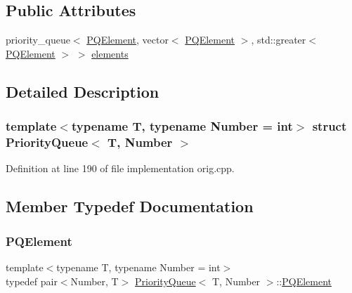 \subsection*{Public Attributes}
\begin{DoxyCompactItemize}
\item 
priority\+\_\+queue$<$ \hyperlink{struct_priority_queue_ae86a19aae3f9a32a1d76dfdab34eb70b}{P\+Q\+Element}, vector$<$ \hyperlink{struct_priority_queue_ae86a19aae3f9a32a1d76dfdab34eb70b}{P\+Q\+Element} $>$, std\+::greater$<$ \hyperlink{struct_priority_queue_ae86a19aae3f9a32a1d76dfdab34eb70b}{P\+Q\+Element} $>$ $>$ \hyperlink{struct_priority_queue_a289cc383607c83fe77a0d571cb06bb01}{elements}
\end{DoxyCompactItemize}


\subsection{Detailed Description}
\subsubsection*{template$<$typename T, typename Number = int$>$\newline
struct Priority\+Queue$<$ T, Number $>$}



Definition at line 190 of file implementation orig.\+cpp.



\subsection{Member Typedef Documentation}
\mbox{\label{struct_priority_queue_ae86a19aae3f9a32a1d76dfdab34eb70b}} 
\subsubsection{\texorpdfstring{P\+Q\+Element}{PQElement}\hspace{0.1cm}{\footnotesize\ttfamily [1/2]}}
{\footnotesize\ttfamily template$<$typename T, typename Number = int$>$ \\
typedef pair$<$Number, T$>$ \hyperlink{struct_priority_queue}{Priority\+Queue}$<$ T, Number $>$\+::\hyperlink{struct_priority_queue_ae86a19aae3f9a32a1d76dfdab34eb70b}{P\+Q\+Element}}



